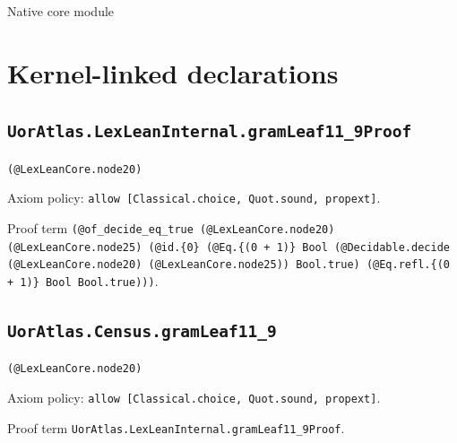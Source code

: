 \documentclass[11pt]{article}
\begin{document}
\begin{center}{\LARGE Native core module}\end{center}
\section*{Kernel-linked declarations}
\subsection*{\texttt{UorAtlas.LexLeanInternal.gramLeaf11\_9Proof}}
\noindent\texttt{(@LexLeanCore.node20)}\par
\noindent Axiom policy: \texttt{allow [Classical.choice, Quot.sound, propext]}.\par
\noindent Proof term \texttt{(@of\_decide\_eq\_true (@LexLeanCore.node20) (@LexLeanCore.node25) (@id.\{0\} (@Eq.\{(0 + 1)\} Bool (@Decidable.decide (@LexLeanCore.node20) (@LexLeanCore.node25)) Bool.true) (@Eq.refl.\{(0 + 1)\} Bool Bool.true)))}.\par
\subsection*{\texttt{UorAtlas.Census.gramLeaf11\_9}}
\noindent\texttt{(@LexLeanCore.node20)}\par
\noindent Axiom policy: \texttt{allow [Classical.choice, Quot.sound, propext]}.\par
\noindent Proof term \texttt{UorAtlas.LexLeanInternal.gramLeaf11\_9Proof}.\par
\end{document}
